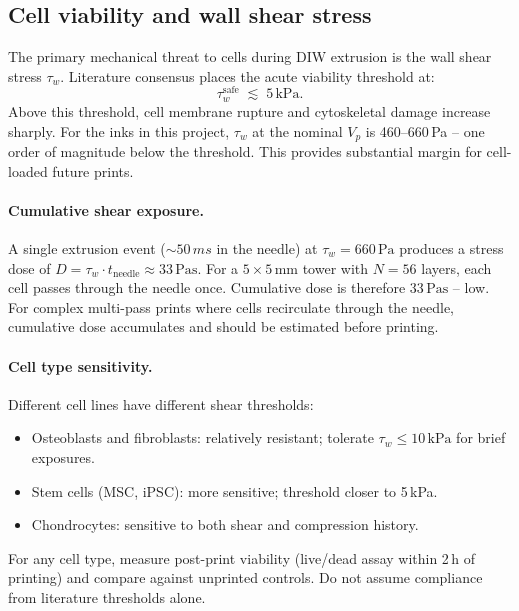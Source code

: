 \documentclass[11pt,a4paper]{article}
\begin{document}
\subsection{Cell viability and wall shear stress}

The primary mechanical threat to cells during DIW extrusion is the wall
shear stress $\tau_w$. Literature consensus \citep{BlaeserEtAl2016}
places the acute viability threshold at:
\begin{equation}
\tau_w^\mathrm{safe} \;\lesssim\; 5\,\si{\kPa}.
\label{eq:tauw_safe}
\end{equation}
Above this threshold, cell membrane rupture and cytoskeletal damage
increase sharply. For the inks in this project, $\tau_w$ at the nominal
$V_p$ is 460--660\,\si{\Pa} -- one order of magnitude below the threshold.
This provides substantial margin for cell-loaded future prints.

\paragraph{Cumulative shear exposure.}
A single extrusion event ($\sim 50\,\si{ms}$ in the needle) at
$\tau_w=660\,\si{\Pa}$ produces a stress dose of
$D=\tau_w\cdot t_\mathrm{needle}\approx 33\,\si{\Pa\s}$. For a
$5\times 5\,\si{\mm}$ tower with $N=56$ layers, each cell passes through
the needle once. Cumulative dose is therefore $33\,\si{\Pa\s}$ -- low.
For complex multi-pass prints where cells recirculate through the needle,
cumulative dose accumulates and should be estimated before printing.

\paragraph{Cell type sensitivity.}
Different cell lines have different shear thresholds:
\begin{itemize}[leftmargin=1.4em,itemsep=2pt]
\item Osteoblasts and fibroblasts: relatively resistant; tolerate
  $\tau_w\leq 10\,\si{\kPa}$ for brief exposures.
\item Stem cells (MSC, iPSC): more sensitive; threshold closer to
  5\,\si{\kPa}.
\item Chondrocytes: sensitive to both shear and compression history.
\end{itemize}
For any cell type, measure post-print viability (live/dead assay within
2\,\si{\hour} of printing) and compare against unprinted controls. Do
not assume compliance from literature thresholds alone.
\end{document}
